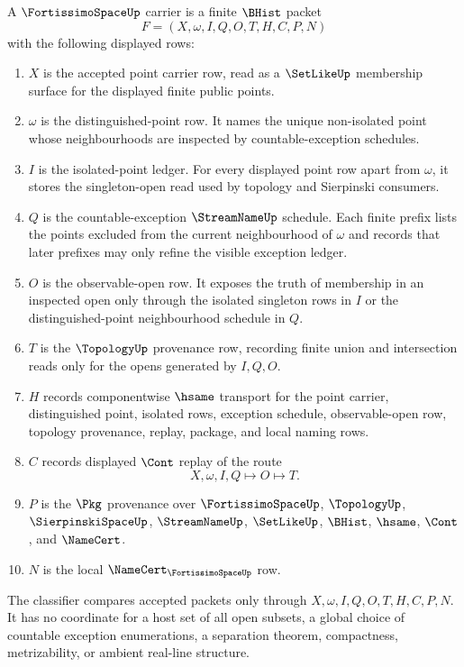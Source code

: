\begin{definition}
\label{def:fortissimo-space-carrier}
A $\FortissimoSpaceUp$ carrier is a finite $\BHist$ packet
$$
F=(X,\omega,I,Q,O,T,H,C,P,N)
$$
with the following displayed rows:
\begin{enumerate}
\item $X$ is the accepted point carrier row, read as a $\SetLikeUp$ membership surface for the displayed finite public points.
\item $\omega$ is the distinguished-point row. It names the unique non-isolated point whose neighbourhoods are inspected by countable-exception schedules.
\item $I$ is the isolated-point ledger. For every displayed point row apart from $\omega$, it stores the singleton-open read used by topology and Sierpinski consumers.
\item $Q$ is the countable-exception $\StreamNameUp$ schedule. Each finite prefix lists the points excluded from the current neighbourhood of $\omega$ and records that later prefixes may only refine the visible exception ledger.
\item $O$ is the observable-open row. It exposes the truth of membership in an inspected open only through the isolated singleton rows in $I$ or the distinguished-point neighbourhood schedule in $Q$.
\item $T$ is the $\TopologyUp$ provenance row, recording finite union and intersection reads only for the opens generated by $I,Q,O$.
\item $H$ records componentwise $\hsame$ transport for the point carrier, distinguished point, isolated rows, exception schedule, observable-open row, topology provenance, replay, package, and local naming rows.
\item $C$ records displayed $\Cont$ replay of the route
$$
X,\omega,I,Q \longmapsto O \longmapsto T .
$$
\item $P$ is the $\Pkg$ provenance over $\FortissimoSpaceUp$, $\TopologyUp$, $\SierpinskiSpaceUp$, $\StreamNameUp$, $\SetLikeUp$, $\BHist$, $\hsame$, $\Cont$, and $\NameCert$.
\item $N$ is the local $\NameCert_{\FortissimoSpaceUp}$ row.
\end{enumerate}
The classifier compares accepted packets only through $X,\omega,I,Q,O,T,H,C,P,N$. It has no coordinate for a host set of all open subsets, a global choice of countable exception enumerations, a separation theorem, compactness, metrizability, or ambient real-line structure.
\end{definition}

